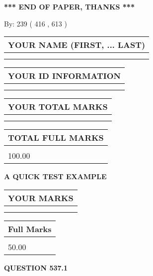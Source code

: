 \documentclass[12pt]{article}
\begin{document}
\vspace{1.0in} 
{\textbf{\large{ *** END OF PAPER, THANKS *** }}} 
   
   
\hspace{1.0in} By: 
 239 ( 416 ,  613 )
   
   
   
   
\newpage 
\setcounter{page}{ 
   537001 } 
   
   
   
   
\noindent\begin{tabular}{|l|}
\hline
YOUR NAME (FIRST, ... LAST)  \\
\hline
 \\ 
 \\ 
\hline
\end{tabular}
\hspace{0.05in} \begin{tabular}{|l|}
\hline
 YOUR   ID   INFORMATION  \\
\hline
 \\ 
 \\ 
\hline
\end{tabular}
   
   
\vspace{0.2in}\noindent\begin{tabular}{|l|}
\hline
YOUR TOTAL MARKS  \\
\hline
 \\ 
 \\ 
\hline
\end{tabular}
\hspace{0.05in} \begin{tabular}{|l|}
\hline
TOTAL FULL MARKS  \\
\hline
 \\ 
100.00 \\
\hline
\end{tabular}
   
   
 \vspace{0.2in}
{\LARGE {\textbf{ A QUICK TEST EXAMPLE}}}
   
   
  
\vspace{0.2in}
  
\noindent\begin{tabular}{|l|}
\hline
 YOUR MARKS  \\
\hline
 \\ 
 \\ 
\hline
\end{tabular}
\hspace{0.05in} \begin{tabular}{|l|}
\hline
 Full Marks  \\
\hline
 \\ 
50.00 \\
\hline
\end{tabular}
{\textbf{\Large{QUESTION
537.1 
}}}
  
\end{document}
